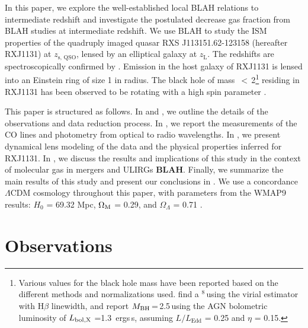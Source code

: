 \documentclass[]{emulateapj}
\begin{document}
In this paper, we explore the well-established local BLAH relations to intermediate redshift
and investigate the postulated decrease gas fraction from BLAH studies at intermediate 
redshift.
We use BLAH to study the ISM properties of the quadruply imaged
quasar RXS J113151.62-123158 (hereafter RXJ1131) at
$z_\textrm{s, QSO}$, lensed by an
elliptical galaxy at $z_\textrm{L}$. The redshifts 
are spectroscopically confirmed by \citet[hereafter S03]{Sluse03a}.
Emission in the host galaxy of RXJ1131 is lensed into an Einstein ring of size 1 in radius.
The black hole of mass \mbh\,$<$\,2\Msun\footnote{Various values for the black hole 
mass have been reported based on the different methods and normalizations used. \citet{Dai10a} find a 
\mbh{}$^{8}$\,\Msun using the virial estimator with H$\beta$ linewidth,
and \citet{Pooley07a} report $M_{\rm BH}$\,=\,2.5\,\Msun using the
AGN bolometric luminosity of $L_{\rm bol, X}$ =1.3\, ergs\,s\pmOne, 
assuming $L$$/$$L_\textrm{Edd}$ = 0.25 and $\eta$ = 0.15.}
residing in RXJ1131 has been observed to 
be rotating with a high spin parameter
\citep[$a$\,$\sim$\,0.9;][]{Reis14a}.

This paper is structured as follows.
In  and , we outline the details of the observations and data reduction process.
In , we report the measurements of the CO lines and photometry from optical to radio wavelengths.
In , we present dynamical lens modeling of the \bco data and the physical properties inferred for  RXJ1131.
In , we discuss the results and implications of this study in the context of molecular gas in mergers and ULIRGs {\bf BLAH}.
Finally, we summarize the main results of this study and present our conclusions in .
We use a concordance $\Lambda$CDM cosmology throughout this paper, with
parameters from the WMAP9 results:
$H_0$ = 69.32 \kms Mpc\pmOne, $\Omega_{\rm M}$ = 0.29, and
$\Omega_{\Lambda}$ = 0.71 \citep{Hinshaw13a}.

\section{Observations} \label{sec:obs}
\end{document}
